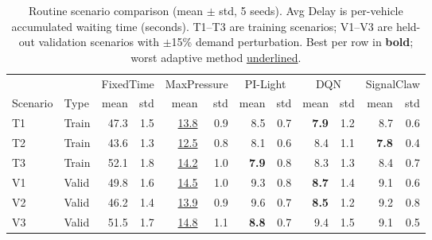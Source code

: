 \begin{table}[t]
\centering
\caption{Routine scenario comparison (mean $\pm$ std, 5 seeds). Avg Delay is per-vehicle accumulated waiting time (seconds). T1--T3 are training scenarios; V1--V3 are held-out validation scenarios with $\pm$15\% demand perturbation. Best per row in \textbf{bold}; worst adaptive method \underline{underlined}.}
\label{tab:routine_results}
\footnotesize
\setlength{\tabcolsep}{3.5pt}
\begin{tabular}{ll|rr|rr|rr|rr|rr}
\toprule
& & \multicolumn{2}{c|}{FixedTime} & \multicolumn{2}{c|}{MaxPressure} & \multicolumn{2}{c|}{PI-Light} & \multicolumn{2}{c|}{DQN} & \multicolumn{2}{c}{SignalClaw} \\
Scenario & Type & mean & std & mean & std & mean & std & mean & std & mean & std \\
\midrule
T1 & Train & 47.3 & 1.5 & \underline{13.8} & 0.9 & 8.5 & 0.7 & \textbf{7.9} & 1.2 & 8.7 & 0.6 \\
T2 & Train & 43.6 & 1.3 & \underline{12.5} & 0.8 & 8.1 & 0.6 & 8.4 & 1.1 & \textbf{7.8} & 0.4 \\
T3 & Train & 52.1 & 1.8 & \underline{14.2} & 1.0 & \textbf{7.9} & 0.8 & 8.3 & 1.3 & 8.4 & 0.7 \\
\midrule
V1 & Valid & 49.8 & 1.6 & \underline{14.5} & 1.0 & 9.3 & 0.8 & \textbf{8.7} & 1.4 & 9.1 & 0.6 \\
V2 & Valid & 46.2 & 1.4 & \underline{13.9} & 0.9 & 9.6 & 0.7 & \textbf{8.5} & 1.2 & 9.2 & 0.8 \\
V3 & Valid & 51.5 & 1.7 & \underline{14.8} & 1.1 & \textbf{8.8} & 0.7 & 9.4 & 1.5 & 9.1 & 0.5 \\
\bottomrule
\end{tabular}
\end{table}

